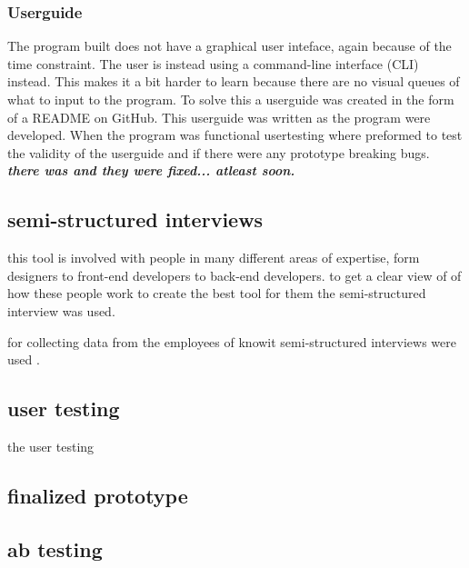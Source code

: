 \subsubsection{Userguide}%
\label{ssub:Userguide}
The program built does not have a graphical user inteface, again because of the time constraint. The user is instead using a command-line interface (CLI) instead. This makes it a bit harder to learn because there are no visual queues of what to input to the program. To solve this a userguide was created in the form of a README on GitHub. This userguide was written as the program were developed. When the program was functional usertesting where preformed to test the validity of the userguide and if there were any prototype breaking bugs. \textit{ \textbf{there was and they were fixed... atleast soon.} }







\subsection{semi-structured interviews}%
\label{sub:inteviews}
this tool is involved with people in many different areas of expertise, form designers to front-end developers to back-end developers. to get a clear view of of how these people work to create the best tool for them the semi-structured interview was used. 

for collecting data from the employees of knowit semi-structured interviews were used \cite{galletta2013mastering}. 




\subsection{user testing}%
\label{sub:usertesting}
the user testing 

\subsection{ finalized prototype }%
\label{sub:finalizingprototype}

\subsection{ ab testing }%
\label{sub:mabtesting}
